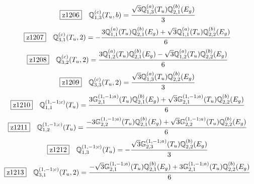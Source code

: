 \documentclass[fleqn,10pt,landscape]{jsarticle}
\begin{document}
\begin{dmath*}
\hspace*{3mm}\fbox{z1206}\quad \mathbb{Q}_{1,3}^{(c)}(T_{u},b)=\frac{\sqrt{3} \mathbb{Q}_{1,3}^{(a)}(T_{u}) \mathbb{Q}_{2,1}^{(b)}(E_{g})}{3}
\end{dmath*}
\begin{dmath*}
\hspace*{3mm}\fbox{z1207}\quad \mathbb{Q}_{3,1}^{(c)}(T_{u},2)=- \frac{3 \mathbb{Q}_{1,1}^{(a)}(T_{u}) \mathbb{Q}_{2,1}^{(b)}(E_{g}) + \sqrt{3} \mathbb{Q}_{1,1}^{(a)}(T_{u}) \mathbb{Q}_{2,2}^{(b)}(E_{g})}{6}
\end{dmath*}
\begin{dmath*}
\hspace*{3mm}\fbox{z1208}\quad \mathbb{Q}_{3,2}^{(c)}(T_{u},2)=\frac{3 \mathbb{Q}_{1,2}^{(a)}(T_{u}) \mathbb{Q}_{2,1}^{(b)}(E_{g}) - \sqrt{3} \mathbb{Q}_{1,2}^{(a)}(T_{u}) \mathbb{Q}_{2,2}^{(b)}(E_{g})}{6}
\end{dmath*}
\begin{dmath*}
\hspace*{3mm}\fbox{z1209}\quad \mathbb{Q}_{3,3}^{(c)}(T_{u},2)=\frac{\sqrt{3} \mathbb{Q}_{1,3}^{(a)}(T_{u}) \mathbb{Q}_{2,2}^{(b)}(E_{g})}{3}
\end{dmath*}
\begin{dmath*}
\hspace*{3mm}\fbox{z1210}\quad \mathbb{Q}_{1,1}^{(1,-1;c)}(T_{u})=\frac{3 \mathbb{G}_{2,1}^{(1,-1;a)}(T_{u}) \mathbb{Q}_{2,1}^{(b)}(E_{g}) + \sqrt{3} \mathbb{G}_{2,1}^{(1,-1;a)}(T_{u}) \mathbb{Q}_{2,2}^{(b)}(E_{g})}{6}
\end{dmath*}
\begin{dmath*}
\hspace*{3mm}\fbox{z1211}\quad \mathbb{Q}_{1,2}^{(1,-1;c)}(T_{u})=\frac{- 3 \mathbb{G}_{2,2}^{(1,-1;a)}(T_{u}) \mathbb{Q}_{2,1}^{(b)}(E_{g}) + \sqrt{3} \mathbb{G}_{2,2}^{(1,-1;a)}(T_{u}) \mathbb{Q}_{2,2}^{(b)}(E_{g})}{6}
\end{dmath*}
\begin{dmath*}
\hspace*{3mm}\fbox{z1212}\quad \mathbb{Q}_{1,3}^{(1,-1;c)}(T_{u})=- \frac{\sqrt{3} \mathbb{G}_{2,3}^{(1,-1;a)}(T_{u}) \mathbb{Q}_{2,2}^{(b)}(E_{g})}{3}
\end{dmath*}
\begin{dmath*}
\hspace*{3mm}\fbox{z1213}\quad \mathbb{Q}_{3,1}^{(1,-1;c)}(T_{u},2)=\frac{- \sqrt{3} \mathbb{G}_{2,1}^{(1,-1;a)}(T_{u}) \mathbb{Q}_{2,1}^{(b)}(E_{g}) + 3 \mathbb{G}_{2,1}^{(1,-1;a)}(T_{u}) \mathbb{Q}_{2,2}^{(b)}(E_{g})}{6}
\end{dmath*}
\end{document}
